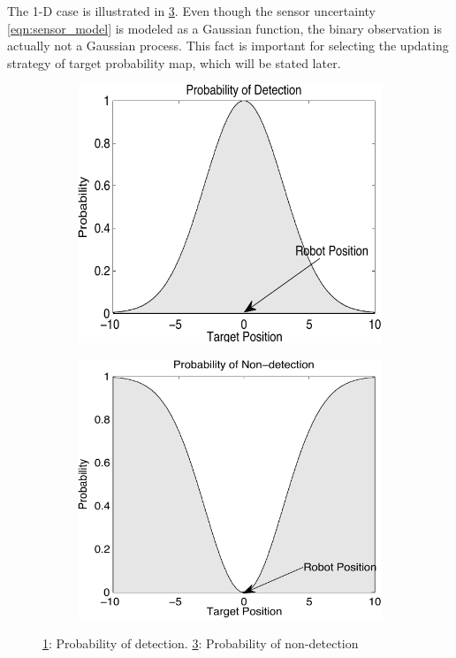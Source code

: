 \documentclass[twocolumn,10pt]{asme2e}
\begin{document}
The 1-D case is illustrated in \cref{fig:sensor_model2}.
Even though the sensor uncertainty \cref{eqn:sensor_model} is modeled as a Gaussian function, the binary observation is actually not a Gaussian process.
This fact is important for selecting the updating strategy of target probability map, which will be stated later.
\begin{figure}
	\begin{subfigure}[b]{0.2\textwidth}
		\includegraphics[width=\textwidth]{figures/PoD}
		\caption{}\label{fig:sensor_model1}
	\end{subfigure}
	\begin{subfigure}[b]{0.2\textwidth}
		\includegraphics[width=\textwidth]{figures/PoND}
		\caption{}\label{fig:sensor_model2}
	\end{subfigure}
	\caption{\cref{fig:sensor_model1}: Probability of detection. \cref{fig:sensor_model2}: Probability of non-detection}
\end{figure}
\end{document}
